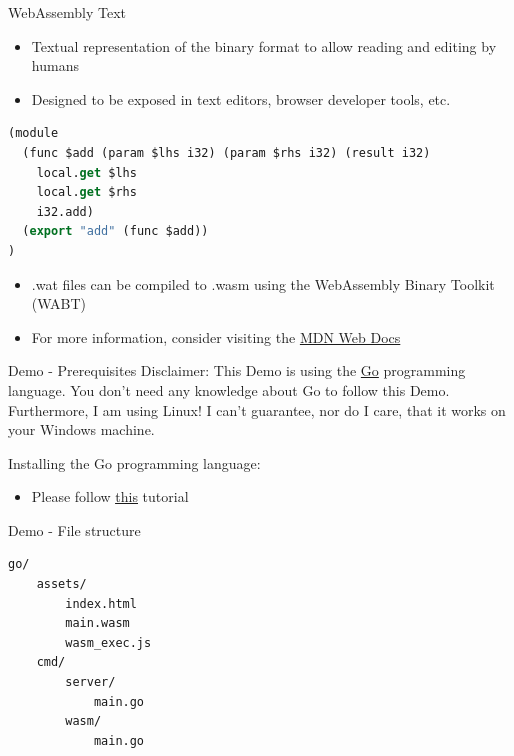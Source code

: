 \documentclass{beamer}
\begin{document}
\begin{frame}[fragile]{WebAssembly Text}
    \begin{itemize}
        \item Textual representation of the binary format to allow reading and editing by humans
        \item Designed to be exposed in text editors, browser developer tools, etc.
    \end{itemize}
    \begin{lstlisting}[language=Lisp,basicstyle=\footnotesize]
(module
  (func $add (param $lhs i32) (param $rhs i32) (result i32)
    local.get $lhs
    local.get $rhs
    i32.add)
  (export "add" (func $add))
)
    \end{lstlisting}
    \begin{itemize}
        \item .wat files can be compiled to .wasm using the WebAssembly Binary Toolkit (WABT)
        \item For more information, consider visiting the \href{https://developer.mozilla.org/en-US/docs/WebAssembly/Understanding_the_text_format}{MDN Web Docs}
    \end{itemize}
\end{frame}

\begin{frame}{Demo - Prerequisites}
    Disclaimer: This Demo is using the \href{https://go.dev/}{Go} programming language. You don't need any knowledge about Go to follow this Demo. Furthermore, I am using Linux! I can't guarantee, nor do I care, that it works on your Windows machine.

    Installing the Go programming language:
    \begin{itemize}
        \item Please follow \underline{\href{https://go.dev/doc/install}{this}} tutorial
    \end{itemize}

\end{frame}

\begin{frame}[fragile]{Demo - File structure}

    \begin{lstlisting}[language=Bash,basicstyle=\footnotesize]
go/
    assets/
        index.html
        main.wasm
        wasm_exec.js
    cmd/
        server/
            main.go
        wasm/
            main.go
    \end{lstlisting}
\end{frame}
\end{document}
